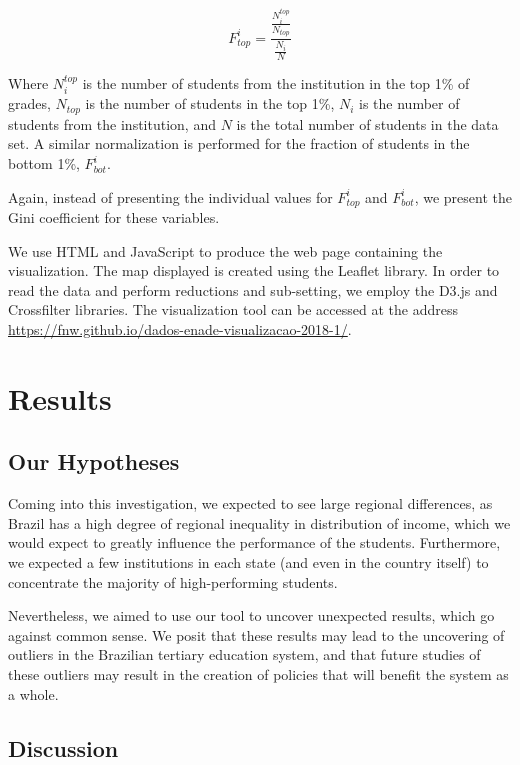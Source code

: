 \documentclass{vgtc}                          %
\begin{document}
\begin{equation}\label{eq:ftopinst}
F_{top}^{i} = \frac{\frac{N_{i}^{top}}{N_{top}}}{\frac{N_{i}}{N}}
\end{equation}

Where $N_{i}^{top}$ is the number of students from the institution in the top 1\% of grades, $N_{top}$ is the number of students in the top 1\%, $N_{i}$ is the number of students from the institution, and $N$ is the total number of students in the data set. A similar normalization is performed for the fraction of students in the bottom 1\%, $F_{bot}^{i}$.

Again, instead of presenting the individual values for $F_{top}^{i}$ and $F_{bot}^{i}$, we present the Gini coefficient for these variables.


We use HTML and JavaScript to produce the web page containing the visualization. The map displayed is created using the Leaflet library. In order to read the data and perform reductions and sub-setting, we employ the D3.js and Crossfilter libraries. The visualization tool can be accessed at the address \url{https://fnw.github.io/dados-enade-visualizacao-2018-1/}.


\section{Results}

\subsection{Our Hypotheses}
Coming into this investigation, we expected to see large regional differences, as Brazil has a high degree of regional inequality in distribution of income, which we would expect to greatly influence the performance of the students. Furthermore, we expected a few institutions in each state (and even in the country itself) to concentrate the majority of high-performing students.

Nevertheless, we aimed to use our tool to uncover unexpected results, which go against common sense. We posit that these results may lead to the uncovering of outliers in the Brazilian tertiary education system, and that future studies of these outliers may result in the creation of policies that will benefit the system as a whole.

\subsection{Discussion}
\end{document}

